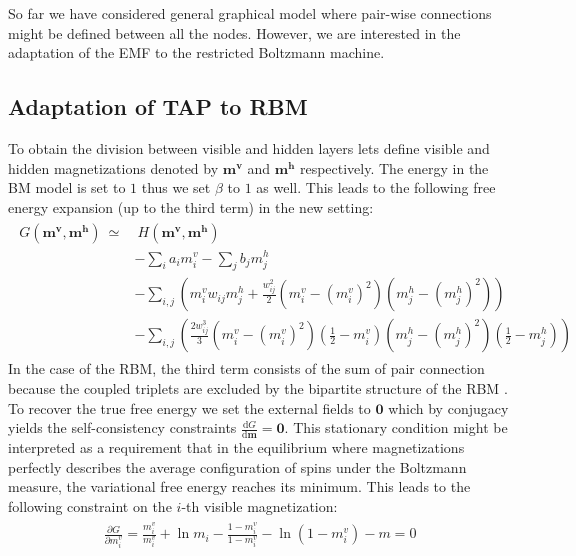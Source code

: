 \documentclass[../report/report.tex]{subfiles}
\begin{document}
So far we have considered general graphical model where pair-wise connections might be defined between all the nodes. However, we are interested in the adaptation of the EMF to the restricted Boltzmann machine.
\subsection{Adaptation of TAP to RBM}
To obtain the division between visible and hidden layers lets define visible and hidden magnetizations denoted by $\mathbf{m}^\mathbf{v}$ and $\mathbf{m}^\mathbf{h}$ respectively. The energy in the BM model is set to $1$ thus we set $\beta$ to $1$ as well. This leads to the following free energy expansion (up to the third term) in the new setting:
\begin{align}
\begin{split}
G(\mathbf{m^v},\mathbf{m^h}) ~\simeq & ~H(\mathbf{m^v}, \mathbf{m^h}) \\
&  - \sum_i a_i m_i^v - \sum_j b_j m_j^h \\
 & - \sum_{i,j} \left( 
 m_i^v w_{ij} m_j^h +  \frac{w_{ij}^2}{2}(m_i^v - (m_i^v)^2)(m_j^h - (m_j^h)^2) 
  \right) \\
    &  - \sum_{i,j} \left( 
 \frac{2w_{ij}^3}{3}(m_i^v - (m_i^v)^2)(\frac{1}{2} - m_i^v)(m_j^h - (m_j^h)^2)(\frac{1}{2} - m_j^h)  \right) 
\label{eq:expansionRBM}
\end{split}
\end{align}
In the case of the RBM, the third term consists of the sum of pair connection because the coupled triplets are excluded by the bipartite structure of the RBM \cite{gabrie2015training}. To recover the true free energy we set the external fields to $\mathbf{0}$ which by conjugacy yields the self-consistency constraints $\frac{\text{d}G}{\text{d} \mathbf{m}} = \mathbf{0}$.
This stationary condition might be interpreted as a requirement that in the equilibrium where magnetizations perfectly describes the average configuration of spins under the Boltzmann measure, the variational free energy reaches its minimum. This leads to the following constraint on the $i$-th visible magnetization:
\begin{align}
\begin{split}
 \frac{\partial G}{\partial m_i^v} = \frac{m_i^v}{m_i^v} + \ln m_i - \frac{1 - m_i^v}{1 - m_i^v} - \ln (1 - m_i^v) -m = 0
\end{split}
\end{align}
\end{document}
